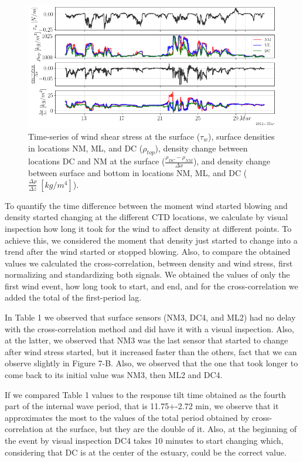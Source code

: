 \documentclass[11pt,letterpaper]{article}
\begin{document}
\begin{figure}[h!]
    \centering
    \includegraphics[width=\textwidth]{Imagenes/diff.png}
    \caption{Time-series of wind shear stress at the surface ($\tau_w$), surface densities in locations NM, ML, and DC ($\rho_{top}$), density change between locations DC and NM at the surface ($\frac{\rho_{DC}-\rho_{NM}}{\Delta x}$), and density change between surface and bottom in locations NM, ML, and DC ($\frac{\Delta \rho}{\Delta z} \; [kg/m^4]$).}
    \label{fig:diff}
\end{figure}

To quantify the time difference between the moment wind started blowing and density started changing at the different CTD locations, we calculate by visual inspection how long it took for the wind to affect density at different points. To achieve this, we considered the moment that density just started to change into a trend after the wind started or stopped blowing. Also, to compare the obtained values we calculated the cross-correlation, between density and wind stress, first normalizing and standardizing both signals. We obtained the values of only the first wind event, how long took to start, and end, and for the cross-correlation we added the total of the first-period lag.

In Table 1 we observed that surface sensors (NM3, DC4, and ML2) had no delay with the cross-correlation method and did have it with a visual inspection. Also, at the latter, we observed that NM3 was the last sensor that started to change after wind stress started, but it increased faster than the others, fact that we can observe slightly in Figure 7-B. Also, we observed that the one that took longer to come back to its initial value was NM3, then ML2 and DC4.


If we compared Table 1 values to the response tilt time obtained as the fourth part of the internal wave period, that is 11.75+-2.72 min, we observe that it approximates the most to the values of the total period obtained by cross-correlation at the surface, but they are the double of it. Also, at the beginning of the event by visual inspection DC4 takes 10 minutes to start changing which, considering that DC is at the center of the estuary, could be the correct value.
\end{document}
